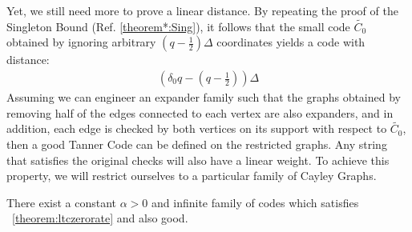 Yet, we still need more to prove a linear distance. By repeating the proof of the Singleton Bound (Ref. \ref{theorem*:Sing}), it follows that the small code $\tilde{C_{0}}$ obtained by ignoring arbitrary $(q - \frac{1}{2})\Delta$ coordinates yields a code with distance:
\begin{equation*}
  \begin{split}
    \left( \delta_{0}q - \left( q - \frac{1}{2} \right) \right)\Delta
  \end{split}
\end{equation*}
Assuming we can engineer an expander family such that the graphs obtained by removing half of the edges connected to each vertex are also expanders, and in addition, each edge is checked by both vertices on its support with respect to $\tilde{C_{0}}$, then a good Tanner Code can be defined on the restricted graphs. Any string that satisfies the original checks will also have a linear weight. To achieve this property, we will restrict ourselves to a particular family of Cayley Graphs.
\begin{theorem}
\label{theorem:highflux}
  There exist a constant $\alpha > 0 $ and infinite family of codes which satisfies ~\cref{theorem:ltczerorate} and also good.
\end{theorem}


